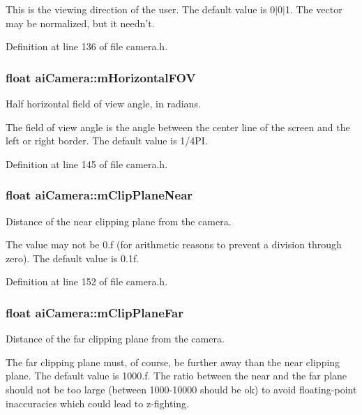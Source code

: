 This is the viewing direction of the user. The default value is 0$|$0$|$1. The vector may be normalized, but it needn't. 

Definition at line 136 of file camera.h.\hypertarget{structai_camera_dcdea73ece19ea0a9068f5544ec23592}{
\subsubsection[mHorizontalFOV]{\setlength{\rightskip}{0pt plus 5cm}float {\bf aiCamera::mHorizontalFOV}}}
\label{structai_camera_dcdea73ece19ea0a9068f5544ec23592}


Half horizontal field of view angle, in radians.

The field of view angle is the angle between the center line of the screen and the left or right border. The default value is 1/4PI. 

Definition at line 145 of file camera.h.\hypertarget{structai_camera_720e8c94c036dcefe4b13cc1c69c521e}{
\subsubsection[mClipPlaneNear]{\setlength{\rightskip}{0pt plus 5cm}float {\bf aiCamera::mClipPlaneNear}}}
\label{structai_camera_720e8c94c036dcefe4b13cc1c69c521e}


Distance of the near clipping plane from the camera.

The value may not be 0.f (for arithmetic reasons to prevent a division through zero). The default value is 0.1f. 

Definition at line 152 of file camera.h.\hypertarget{structai_camera_a9ccf77e3d7ca3dc8f46df931b65172f}{
\subsubsection[mClipPlaneFar]{\setlength{\rightskip}{0pt plus 5cm}float {\bf aiCamera::mClipPlaneFar}}}
\label{structai_camera_a9ccf77e3d7ca3dc8f46df931b65172f}


Distance of the far clipping plane from the camera.

The far clipping plane must, of course, be further away than the near clipping plane. The default value is 1000.f. The ratio between the near and the far plane should not be too large (between 1000-10000 should be ok) to avoid floating-point inaccuracies which could lead to z-fighting. 

